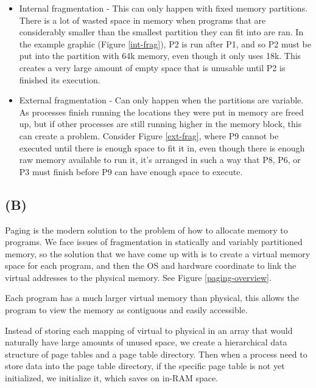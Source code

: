 \documentclass[12pt]{article}
\begin{document}
	\begin{itemize}
		\item Internal fragmentation - This can only happen with fixed memory partitions. There is a lot of wasted space in memory when programs that are considerably smaller than the smallest partition they can fit into are ran. In the example graphic (Figure \ref{int-frag}), P2 is run after P1, and so P2 must be put into the partition with 64k memory, even though it only uses 18k. This creates a very large amount of empty space that is unusable until P2 is finished its execution.
		
		\item External fragmentation - Can only happen when the partitions are variable. As processes finish running the locations they were put in memory are freed up, but if other processes are still running higher in the memory block, this can create a problem. Consider Figure \ref{ext-frag}, where P9 cannot be executed until there is enough space to fit it in, even though there is enough raw memory available to run it, it's arranged in such a way that P8, P6, or P3 must finish before P9 can have enough space to execute.
	\end{itemize}

	\subsection*{(B)}
	Paging is the modern solution to the problem of how to allocate memory to programs. We face issues of fragmentation in statically and variably partitioned memory, so the solution that we have come up with is to create a virtual memory space for each program, and then the OS and hardware coordinate to link the virtual addresses to the physical memory. See Figure \ref{paging-overview}.
	
	Each program has a much larger virtual memory than physical, this allows the program to view the memory as contiguous and easily accessible. 
	
	Instead of storing each mapping of virtual to physical in an array that would naturally have large amounts of unused space, we create a hierarchical data structure of page tables and a page table directory. Then when a process need to store data into the page table directory, if the specific page table is not yet initialized, we initialize it, which saves on in-RAM space.
	
\end{document}
